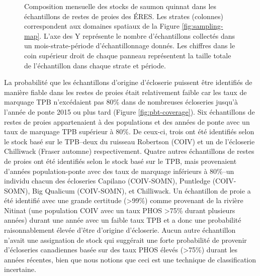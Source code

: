 \begin{figure}[H]
    \centering
    \caption{Composition mensuelle des stocks de saumon quinnat dans les échantillons de restes de proies des ÉRES. Les strates (colonnes) correspondent aux domaines spatiaux de la Figure \ref{fig:sampling-map}. L'axe des Y représente le nombre d'échantillons collectés dans un mois-strate-période d'échantillonnage donnés. Les chiffres dans le coin supérieur droit de chaque panneau représentent la taille totale de l'échantillon dans chaque strate et période.}
    \label{fig:bar-diet}
\end{figure}

La probabilité que les échantillons d'origine d'écloserie puissent être identifiés de manière fiable dans les restes de proies était relativement faible car les taux de marquage TPB n'excédaient pas 80\% dans de nombreuses écloseries jusqu'à l'année de ponte 2015 ou plus tard (Figure \ref{fig:pbt-coverage}). Six échantillons de restes de proies appartenaient à des populations et des années de ponte avec un taux de marquage TPB supérieur à 80\%. De ceux-ci, trois ont été identifiés selon le stock basé sur le TPB--deux du ruisseau Robertson (COIV) et un de l'écloserie Chilliwack (Fraser automne) respectivement. Quatre autres échantillons de restes de proies ont été identifiés selon le stock basé sur le TPB, mais provenaient d'années population-ponte avec des taux de marquage inférieurs à 80\%--un individu chacun des écloseries Capilano (COIV-SOMN), Puntledge (COIV-SOMN), Big Qualicum (COIV-SOMN), et Chilliwack. Un échantillon de proie a été identifié avec une grande certitude (>99\%) comme provenant de la rivière Nitinat (une population COIV avec un taux PHOS >75\% durant plusieurs années) durant une année avec un faible taux TPB et a donc une probabilité raisonnablement élevée d'être d'origine d'écloserie. Aucun autre échantillon n'avait une assignation de stock qui suggérait une forte probabilité de provenir d'écloseries canadiennes basée sur des taux PHOS élevés (>75\%) durant les années récentes, bien que nous notions que ceci est une technique de classification incertaine.

